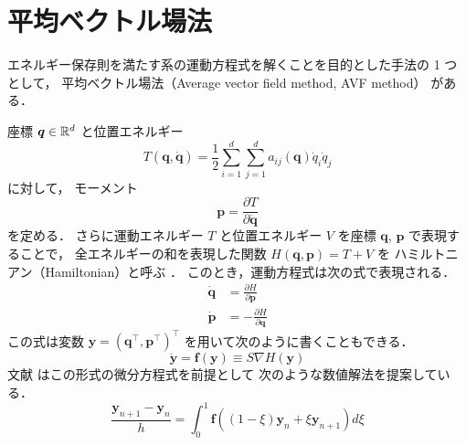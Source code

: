 %

\chapter{平均ベクトル場法}

エネルギー保存則を満たす系の運動方程式を解くことを目的とした手法の 1 つとして，
平均ベクトル場法（Average vector field method, AVF method） \cite{Quispel2008} がある．

座標 $\bm{q} \in \mathbb{R}^d$ と位置エネルギー
\begin{equation}
    T(\bm{q}, \dot{\bm{q}}) = \frac{1}{2} \sum_{i=1}^d \sum_{j=1}^d a_{ij}(\bm{q}) \dot{q}_i \dot{q}_j
\end{equation}
に対して，
モーメント
\begin{equation}
    \bm{p} = \frac{\partial T}{\partial \dot{\bm{q}}}
\end{equation}
を定める．
さらに運動エネルギー $T$ と位置エネルギー $V$ を座標 $\bm{q}$, $\bm{p}$ で表現することで，
全エネルギーの和を表現した関数 $H(\bm{q}, \bm{p}) = T + V$ を
ハミルトニアン（Hamiltonian）と呼ぶ
\cite[Section 3.2]{Morse1953}．
このとき，運動方程式は次の式で表現される．
\begin{align}
    \dot{\bm{q}} & = \frac{\partial H}{\partial \bm{p}}  \\
    \dot{\bm{p}} & = -\frac{\partial H}{\partial \bm{q}}
\end{align}
この式は変数 $\bm{y} = (\bm{q}^\top, \bm{p}^\top)^\top$ を用いて次のように書くこともできる．
\begin{equation}
    \dot{\bm{y}} = \bm{f}(\bm{y}) \equiv S \nabla H(\bm{y})
\end{equation}
文献 \cite{Quispel2008} はこの形式の微分方程式を前提として
次のような数値解法を提案している．
\begin{equation}
    \frac{\bm{y}_{n+1} - \bm{y}_n}{h}
    = \int_{0}^{1} \bm{f}((1 - \xi) \bm{y}_n + \xi \bm{y}_{n+1}) d \xi
    \label{eq:ode_average-vector-field_update-2-order}
\end{equation}

